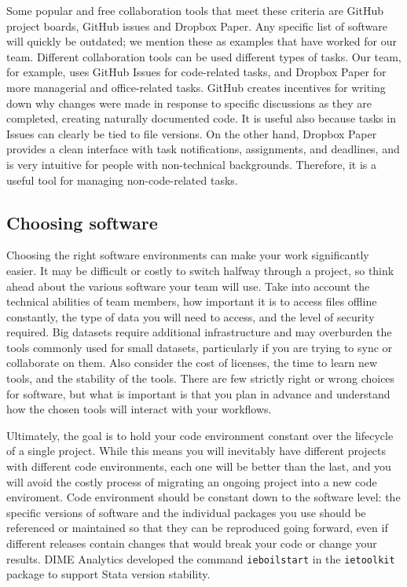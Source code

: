 Some popular and free collaboration tools that meet these criteria are
GitHub project boards, GitHub issues and Dropbox Paper.
Any specific list of software will quickly be outdated;
we mention these as examples that have worked for our team.
Different collaboration tools can be used different types of tasks.
Our team, for example, uses GitHub Issues for code-related tasks,
and Dropbox Paper for more managerial and office-related tasks.
GitHub creates incentives for writing down why changes were made
in response to specific discussions
as they are completed, creating naturally documented code.
It is useful also because tasks in Issues can clearly be tied to file versions.
On the other hand, Dropbox Paper provides a clean interface with task notifications,
assignments, and deadlines,
and is very intuitive for people with non-technical backgrounds.
Therefore, it is a useful tool for managing non-code-related tasks.

\subsection{Choosing software}

Choosing the right software environments can make your work significantly easier.
It may be difficult or costly to switch halfway through a project, so
think ahead about the various software your team will use.
Take into account the technical abilities of team members,
how important it is to access files offline constantly,
the type of data you will need to access,
and the level of security required.
Big datasets require additional infrastructure and may overburden
the tools commonly used for small datasets,
particularly if you are trying to sync or collaborate on them.
Also consider the cost of licenses, the time to learn new tools,
and the stability of the tools.
There are few strictly right or wrong choices for software,
but what is important is that you plan in advance
and understand how the chosen tools will interact with your workflows.

Ultimately, the goal is to hold your code environment constant
over the lifecycle of a single project.
While this means you will inevitably have different projects
with different code environments, each one will be better than the last,
and you will avoid the costly process of migrating an ongoing project
into a new code enviroment.
Code environment should be constant down to the software level:
the specific versions of software and the individual packages you use
should be referenced or maintained so that they can be reproduced going forward,
even if different releases contain changes that would break your code
or change your results.
DIME Analytics developed the command \texttt{ieboilstart} in the \texttt{ietoolkit} package
to support Stata version stability.


